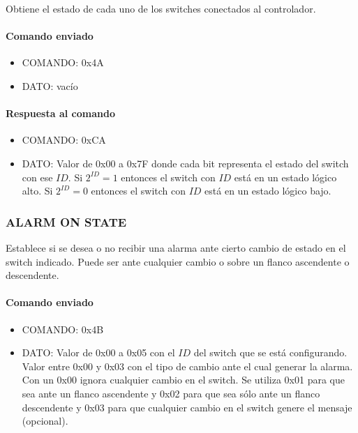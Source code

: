 Obtiene el estado de cada uno de los switches conectados al controlador.

\paragraph*{Comando enviado}

\begin{itemize}
	\item{COMANDO:} 0x4A
	\item{DATO:} vac\'io
\end{itemize}

\paragraph*{Respuesta al comando}

\begin{itemize}
	\item{COMANDO:} 0xCA
	\item{DATO:} Valor de 0x00 a 0x7F donde cada bit representa el estado del switch con ese $ID$.
	Si $2^{ID} = 1$ entonces el switch con $ID$ est\'a en un estado l\'ogico alto.
	Si $2^{ID} = 0$ entonces el switch con $ID$ est\'a en un estado l\'ogico bajo.
\end{itemize}

\subsubsection{ALARM ON STATE}
\label{hA_protocolo_alarm_on_state_servos}

Establece si se desea o no recibir una alarma ante cierto cambio de estado en el switch indicado.
Puede ser ante cualquier cambio o sobre un flanco ascendente o descendente.

\paragraph*{Comando enviado}

\begin{itemize}
	\item{COMANDO:} 0x4B
	\item{DATO:} Valor de 0x00 a 0x05 con el $ID$ del switch que se est\'a configurando.
	Valor entre 0x00 y 0x03 con el tipo de cambio ante el cual generar la alarma.
	Con un 0x00 ignora cualquier cambio en el switch.
	Se utiliza 0x01 para que sea ante un flanco ascendente y 0x02 para que sea s\'olo ante un flanco descendente
	y 0x03 para que cualquier cambio en el switch genere el mensaje (opcional). 

\end{itemize}

